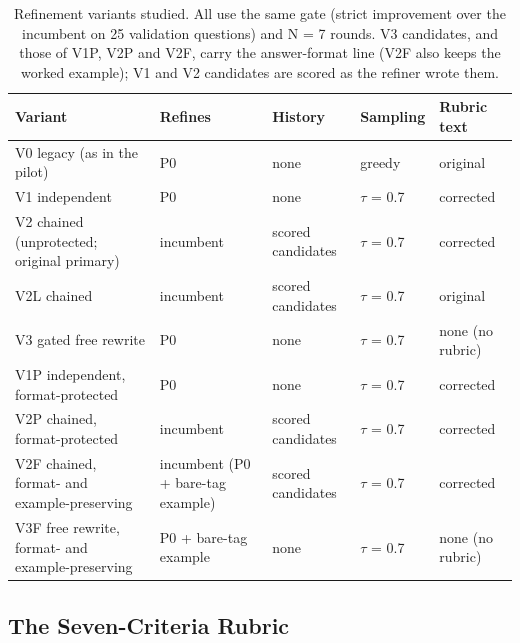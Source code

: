 \documentclass{ieeeaccess}
\begin{document}
\begin{table}[htbp]
\centering
\small
\caption{Refinement variants studied. All use the same gate (strict improvement over the incumbent on 25 validation questions) and N = 7 rounds. V3 candidates, and those of V1P, V2P and V2F, carry the answer-format line (V2F also keeps the worked example); V1 and V2 candidates are scored as the refiner wrote them.}
\begin{tabular}{>{\raggedright\arraybackslash}p{}>{\raggedright\arraybackslash}p{}>{\raggedright\arraybackslash}p{}>{\raggedright\arraybackslash}p{}>{\raggedright\arraybackslash}p{}}
\toprule
\textbf{Variant} & \textbf{Refines} & \textbf{History} & \textbf{Sampling} & \textbf{Rubric text} \\
\midrule
V0 legacy (as in the pilot) & P0 & none & greedy & original \\
V1 independent & P0 & none & $\tau$ = 0.7 & corrected \\
V2 chained (unprotected; original primary) & incumbent & scored candidates & $\tau$ = 0.7 & corrected \\
V2L chained & incumbent & scored candidates & $\tau$ = 0.7 & original \\
V3 gated free rewrite & P0 & none & $\tau$ = 0.7 & none (no rubric) \\
V1P independent, format-protected & P0 & none & $\tau$ = 0.7 & corrected \\
V2P chained, format-protected & incumbent & scored candidates & $\tau$ = 0.7 & corrected \\
V2F chained, format- and example-preserving & incumbent (P0 + bare-tag example) & scored candidates & $\tau$ = 0.7 & corrected \\
V3F free rewrite, format- and example-preserving & P0 + bare-tag example & none & $\tau$ = 0.7 & none (no rubric) \\
\bottomrule
\end{tabular}
\end{table}

\subsection{The Seven-Criteria Rubric}
\end{document}
